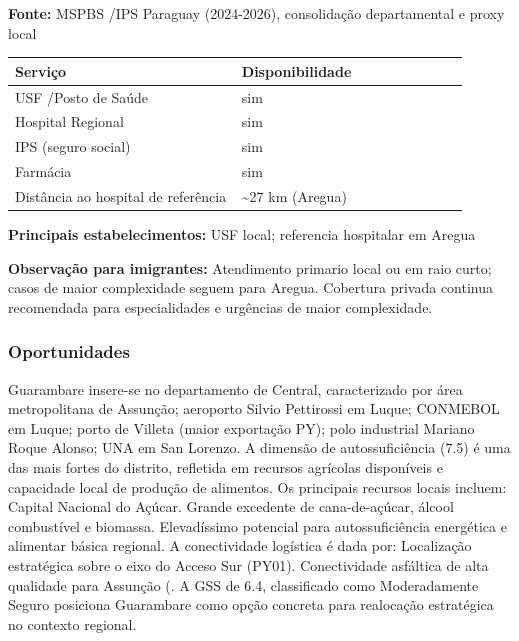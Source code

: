 \textbf{Fonte:} MSPBS /\allowbreak  IPS Paraguay (2024-2026), consolidação
departamental e proxy local

{\def\LTcaptype{none} %
\begin{longtable}{@{}>{\raggedright\arraybackslash}p{0.45\linewidth} >{\raggedright\arraybackslash}p{0.45\linewidth}@{}}
\toprule\noalign{}
Serviço & Disponibilidade \\
\midrule\noalign{}
\endhead
\bottomrule\noalign{}
\endlastfoot
USF /\allowbreak  Posto de Saúde & sim \\
Hospital Regional & sim \\
IPS (seguro social) & sim \\
Farmácia & sim \\
Distância ao hospital de referência & \textasciitilde27 km (Aregua) \\
\end{longtable}
}

\textbf{Principais estabelecimentos:} USF local; referencia hospitalar
em Aregua

\textbf{Observação para imigrantes:} Atendimento primario local ou em
raio curto; casos de maior complexidade seguem para Aregua. Cobertura
privada continua recomendada para especialidades e urgências de maior
complexidade.
\newpage

\subsubsection*{Oportunidades}\label{oport-guarambare-1104}
Guarambare insere-se no departamento de Central, caracterizado por área metropolitana de Assunção; aeroporto Silvio Pettirossi em Luque; CONMEBOL em Luque; porto de Villeta (maior exportação PY); polo industrial Mariano Roque Alonso; UNA em San Lorenzo. A dimensão de autossuficiência (7.5) é uma das mais fortes do distrito, refletida em recursos agrícolas disponíveis e capacidade local de produção de alimentos. Os principais recursos locais incluem: Capital Nacional do Açúcar. Grande excedente de cana-de-açúcar, álcool combustível e biomassa. Elevadíssimo potencial para autossuficiência energética e alimentar básica regional. A conectividade logística é dada por: Localização estratégica sobre o eixo do Acceso Sur (PY01). Conectividade asfáltica de alta qualidade para Assunção (. A GSS de 6.4, classificado como Moderadamente Seguro posiciona Guarambare como opção concreta para realocação estratégica no contexto regional.

